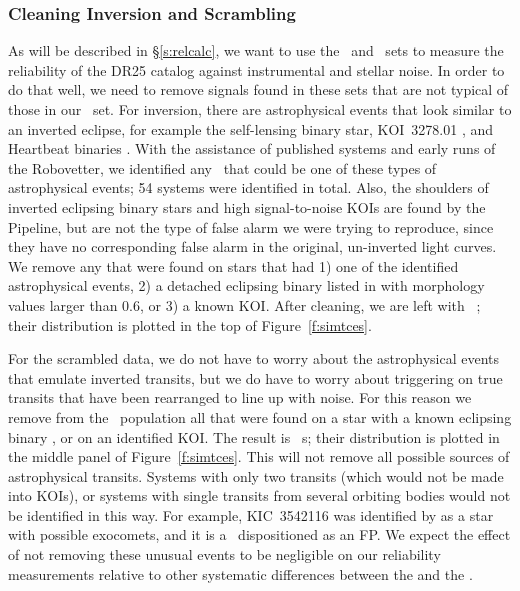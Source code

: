 \vspace{2em}
\subsubsection{Cleaning Inversion and Scrambling}
\label{s:clean}
As will be described in \S\ref{s:relcalc}, we want to use the \invtce\ and \scrtce\ sets to measure the reliability of the DR25 catalog against instrumental and stellar noise. In order to do that well, we need to remove signals found in these sets that are not typical of those in our \opstce\ set. For inversion, there are astrophysical events that look similar to an inverted eclipse, for example the self-lensing binary star, KOI~3278.01 \citep{Kruse2014}, and Heartbeat binaries \citep{Thompson2012}. With the assistance of published systems and early runs of the Robovetter, we identified any \invtce\ that could be one of these types of astrophysical events; 54 systems were identified in total. Also, the shoulders of inverted eclipsing binary stars and high signal-to-noise KOIs are found by the Pipeline, but are not the type of false alarm we were trying to reproduce, since they have no corresponding false alarm in the original, un-inverted light curves. We remove any  that were found on stars that had 1) one of the identified astrophysical events, 2) a detached eclipsing binary listed in \citet{Kirk2016} with morphology values larger than 0.6, or 3) a known KOI.  After cleaning, we are left with \ninvtces\ ; their distribution is plotted in the top of Figure~\ref{f:simtces}.

For the scrambled data, we do not have to worry about the astrophysical events that emulate inverted transits, but we do have to worry about triggering on true transits that have been rearranged to line up with noise. For this reason we remove from the \scrtce\ population all that were found on a star with a known eclipsing binary \citep{Kirk2016}, or on an identified KOI.  The result is \nscrtces\ \scrtce s; their distribution is plotted in the middle panel of Figure~\ref{f:simtces}. 
This will not remove all possible sources of astrophysical transits. Systems with only two transits (which would not be made into KOIs), or systems with single transits from several orbiting bodies would not be identified in this way. For example, KIC~3542116 was identified by \citet{Rappaport2017} as a star with possible exocomets, and it is a \scrtce\ dispositioned as an FP.  We expect the effect of not removing these unusual events to be negligible on our reliability measurements relative to other systematic differences between the  and the .

